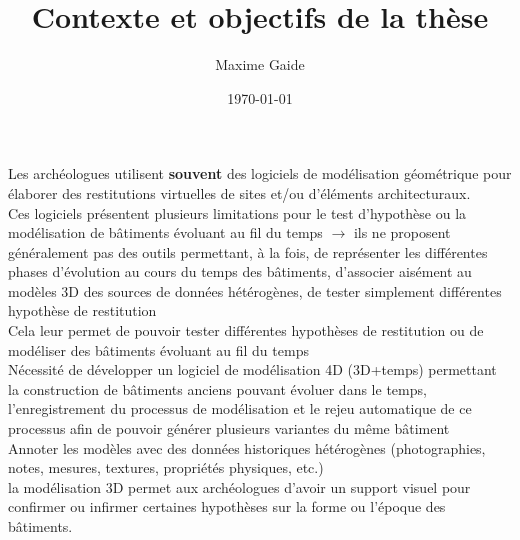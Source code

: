 \documentclass{article}
\author{Maxime Gaide}
\date{\today}
\title{Contexte et objectifs de la thèse}
\begin{document}
\maketitle
Les archéologues utilisent \textbf{souvent} des logiciels de modélisation géométrique
pour élaborer des restitutions virtuelles de sites et/ou d'éléments
architecturaux.\\

Ces logiciels présentent plusieurs limitations pour le test d'hypothèse ou la
modélisation de bâtiments évoluant au fil du temps \(\to\) ils ne proposent
généralement pas des outils permettant, à la fois, de représenter les
différentes phases d'évolution au cours du temps des bâtiments, d'associer
aisément au modèles 3D des sources de données hétérogènes, de tester simplement
différentes hypothèse de restitution\\

Cela leur permet de pouvoir tester différentes hypothèses de restitution ou de
modéliser des bâtiments évoluant au fil du temps\\

Nécessité de développer un logiciel de modélisation 4D (3D+temps) permettant la
construction de bâtiments anciens pouvant évoluer dans le temps,
l'enregistrement du processus de modélisation et le rejeu automatique de ce
processus afin de pouvoir générer plusieurs variantes du même bâtiment\\

Annoter les modèles avec des données historiques hétérogènes (photographies,
notes, mesures, textures, propriétés physiques, etc.)\\

la modélisation 3D permet aux archéologues d'avoir un support visuel pour confirmer ou infirmer certaines hypothèses sur la forme ou l'époque des bâtiments.

\printbibliography
\end{document}
